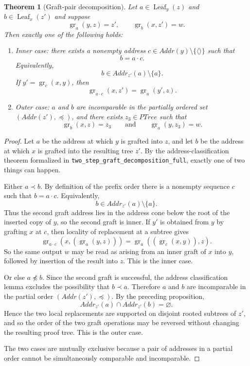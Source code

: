 \documentclass[11pt]{article}
\newtheorem{theorem}{Theorem}
\newcommand{\PTree}{\mathit{PTree}}
\newcommand{\Addr}{\mathit{Addr}}
\newcommand{\graftat}[3]{\operatorname{gr}_{#2}(#3,#1)}
\begin{document}
\begin{theorem}[Graft-pair decomposition]
Let \(a\in \operatorname{Leaf}_y(z)\) and \(b\in \operatorname{Leaf}_x(z')\)
and suppose
\[
\graftat{z}{a}{y}=z',
\qquad
\graftat{z'}{b}{x}=w.
\]
Then exactly one of the following holds:
\begin{enumerate}[label=\textup{(\roman*)}]
\item \emph{Inner case:} there exists a nonempty address
\(c\in \Addr(y)\setminus\{\langle\rangle\}\) such that
\[
b=a\cdot c.
\]
Equivalently,
\[
b\in \Addr_{z'}(a)\setminus\{a\}.
\]
If \(y'=\graftat{y}{c}{x}\), then
\[
\graftat{z'}{a\cdot c}{x}
=
\graftat{z}{a}{y'}.
\]
\item \emph{Outer case:} \(a\) and \(b\) are incomparable in the partially
ordered set \((\Addr(z'),\preceq)\), and there exists \(z_3\in \PTree\) such
that
\[
\graftat{z}{b}{x}=z_3
\qquad\text{and}\qquad
\graftat{z_3}{a}{y}=w.
\]
\end{enumerate}
\end{theorem}

\begin{proof}
Let \(a\) be the address at which \(y\) is grafted into \(z\), and let \(b\)
be the address at which \(x\) is grafted into the resulting tree \(z'\). By
the address-classification theorem formalized in
\texttt{two\_step\_graft\_decomposition\_full}, exactly one of two things can
happen.

Either \(a\prec b\). By definition of the prefix order there is a nonempty
sequence \(c\) such that \(b=a\cdot c\). Equivalently,
\[
b\in \Addr_{z'}(a)\setminus\{a\}.
\]
Thus the second graft address lies in the address cone below the root of the
inserted copy of \(y\), so the second graft is inner. If \(y'\) is obtained
from \(y\) by grafting \(x\) at \(c\), then locality of replacement at a
subtree gives
\[
\graftat{(\graftat{z}{a}{y})}{a\cdot c}{x}
=
\graftat{z}{a}{(\graftat{y}{c}{x})}.
\]
So the same output \(w\) may be read as arising from an inner graft of \(x\)
into \(y\), followed by insertion of the result into \(z\). This is the inner
case.

Or else \(a\not\preceq b\). Since the second graft is successful, the address
classification lemma excludes the possibility that \(b\prec a\). Therefore \(a\)
and \(b\) are incomparable in the partial order \((\Addr(z'),\preceq)\). By
the preceding proposition,
\[
\Addr_{z'}(a)\cap \Addr_{z'}(b)=\varnothing.
\]
Hence the two local replacements are supported on disjoint rooted subtrees of
\(z'\), and so the order of the two graft operations may be reversed without
changing the resulting proof tree. This is the outer case.

The two cases are mutually exclusive because a pair of addresses in a partial
order cannot be simultaneously comparable and incomparable.
\end{proof}
\end{document}
